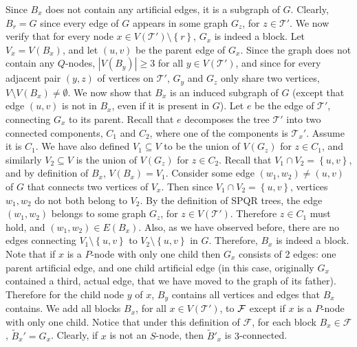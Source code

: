 \documentclass[twoside,leqno,twocolumn]{article}
\newcommand{\set}[1]{\left\{ #1 \right\}}
\newcommand{\sse}{\subseteq}
\newcommand{\tset}{{\mathcal T}}
\newcommand{\fset}{{\mathcal{F}}}
\begin{document}
Since $B_x$ does not contain any artificial edges, it is a subgraph of $G$.
Clearly, $B_r = G$ since every edge of $G$ appears in some graph $G_z$, for $z\in\tset'$.
We now verify that for every node $x\in V(\tset')\setminus\set{r}$, $G_x$ is indeed a block. 
Let $V_x=V(B_x)$, and let $(u,v)$ be the parent edge of $G_x$. 
Since the graph does not contain any $Q$-nodes, $|V(B_y)|\geq 3$ for all $y\in V(\tset')$, and since for every adjacent pair $(y,z)$ of vertices on $\tset'$, $G_y$ and $G_z$ only share two vertices, $V\setminus V(B_x)\neq \emptyset$.
We now show that $B_x$ is an induced subgraph of $G$ (except that edge $(u,v)$ is not in $B_x$,  even if it is present in $G$).
Let $e$ be the edge of $\tset'$, connecting $G_x$ to its parent. Recall that $e$ decomposes the tree $\tset'$ into two connected components, $C_1$ and $C_2$, where one of the components is $\tset_x'$. Assume it is $C_1$. We have also defined $V_1\sse V$ to be the union of $V(G_z)$ for $z\in C_1$, and similarly $V_2\sse V$ is the union of $V(G_z)$ for $z\in C_2$. Recall that $V_1\cap V_2=\set{u,v}$, and by definition of $B_x$, $V(B_x)=V_1$.
Consider some edge $(w_1,w_2) \neq (u,v)$ of $G$ that connects two vertices of $V_x$. Then since  $V_1\cap V_2=\set{u,v}$, vertices $w_1,w_2$ do not both belong to $V_2$. 
By the definition of SPQR trees, the edge $(w_1, w_2)$ belongs to some graph $G_z$, for $z\in V(\tset')$. Therefore $z\in C_1$ must hold, and $(w_1,w_2)\in E(B_x)$. Also, as we have observed before, there are no edges connecting $V_1\setminus\set{u,v}$ to $V_2\setminus\set{u,v}$ in $G$. Therefore, $B_x$ is indeed a block.
Note that if $x$ is a $P$-node with only one child then $G_x$ consists of 2 edges: one parent artificial edge, and one child artificial edge (in this case, originally $G_x$ contained a third, actual edge, that we have moved to the graph of its father). Therefore for the child node $y$ of $x$, $B_y$ contains all vertices and edges that $B_x$ contains. We add all blocks $B_x$, for all $x\in V(\tset')$, to $\cal F$ except if $x$ is a $P$-node with only one child. Notice that under this definition of $\fset$, for each block $B_x\in \fset$, $\tilde{B}_x'=G_x$. Clearly, if $x$ is not an $S$-node, then $\tilde{B}'_x$ is $3$-connected.
\end{document}
